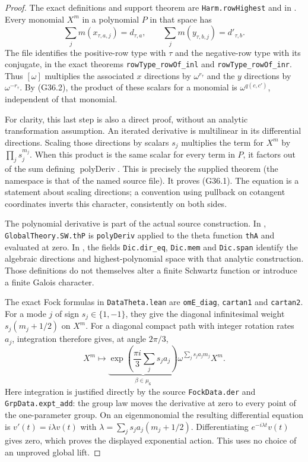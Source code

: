 \begin{proof}
The exact definitions and support theorem are
\texttt{Harm.rowHighest} and
 in
.
Every monomial $X^m$ in a polynomial $P$ in that space has
\[
 \sum_jm(x_{\tau,a,j})=d_{\tau,a},\qquad
 \sum_jm(y_{\tau,b,j})=d'_{\tau,b}.                    \tag{G36.2}
\]
The file
identifies the positive-row type with $\tau$ and the
negative-row type with its conjugate, in the exact theorems
\texttt{rowType\_rowOf\_inl} and
\texttt{rowType\_rowOf\_inr}.
Thus $[\omega]$ multiplies the associated $x$ directions
by $\omega^{r_\tau}$ and the $y$ directions by
$\omega^{-r_\tau}$.
By (G36.2), the product of these scalars for a monomial is
$\omega^{q(c,c')}$, independent of that monomial.

For clarity, this last step is also a direct proof, without
an analytic transformation assumption.
An iterated derivative is multilinear in its differential
directions.  Scaling those directions by scalars $s_j$
multiplies the term for $X^m$ by $\prod_js_j^{m_j}$.
When this product is the same scalar for every term in $P$,
it factors out of the sum defining $\operatorname{polyDeriv}$.
This is precisely the supplied theorem
(the namespace is that of the named source file).
It proves (G36.1).
The equation is a statement about scaling directions;
a convention using pullback on cotangent coordinates
inverts this character, consistently on both sides.

The polynomial derivative is part of the actual source
construction.  In ,
\texttt{GlobalTheory.SW.thP} is \texttt{polyDeriv} applied
to the theta function \texttt{thA} and evaluated at zero.
In , the fields
\texttt{Dic.dir\_eq}, \texttt{Dic.mem} and \texttt{Dic.span}
identify the algebraic directions and highest-polynomial
space with that analytic construction.
Those definitions do not themselves alter a finite
Schwartz function or introduce a finite Galois character.

The exact Fock formulas in \texttt{DataTheta.lean} are
\texttt{omE\_diag}, \texttt{cartan1} and \texttt{cartan2}.
For a mode $j$ of sign $s_j\in\{1,-1\}$,
they give the diagonal infinitesimal weight
$s_j(m_j+1/2)$ on $X^m$.
For a diagonal compact path with integer rotation rates
$a_j$, integration therefore gives, at angle $2\pi/3$,
\[
 X^m\longmapsto
 \underbrace{\exp\left(\frac{\pi i}{3}\sum_j s_ja_j\right)}_{\displaystyle\beta\in\mu_6}
 \omega^{\sum_j s_ja_jm_j}X^m.                        \tag{G36.3}
\]
Here integration is justified directly by the source
\texttt{FockData.der} and \texttt{GrpData.expt\_add}:
the group law moves the derivative at zero to every point
of the one-parameter group.  On an eigenmonomial the
resulting differential equation is
$v'(t)=i\lambda v(t)$ with
$\lambda=\sum_js_ja_j(m_j+1/2)$.
Differentiating $e^{-i\lambda t}v(t)$ gives zero, which
proves the displayed exponential action.
This uses no choice of an unproved global lift.


\end{proof}
